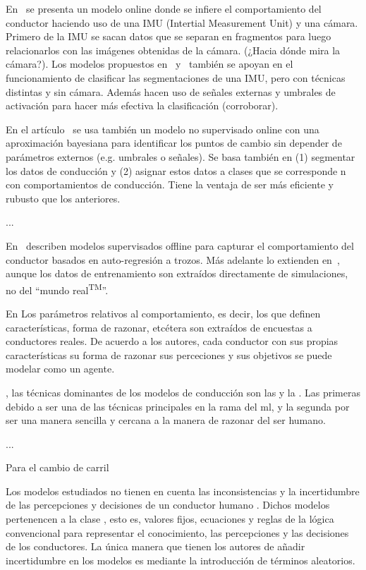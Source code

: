 En~\cite{maye2011bayesian} se presenta un modelo online donde se infiere el comportamiento del conductor haciendo uso de una IMU (Intertial Measurement Unit) y una cámara. Primero de la IMU se sacan datos que se separan en fragmentos para luego relacionarlos con las imágenes obtenidas de la cámara. (\TODO ¿Hacia dónde mira la cámara?). Los modelos propuestos en~\cite{johnson2011driving} y~\cite{van2013driver} también se apoyan en el funcionamiento de clasificar las segmentaciones de una IMU, pero con técnicas distintas y sin cámara. Además hacen uso de señales externas y umbrales de activación para hacer más efectiva la clasificación (\TODO corroborar).

En el artículo~\cite{bender2015unsupervised} se usa también un modelo no supervisado online con una aproximación bayesiana para identificar los puntos de cambio sin depender de parámetros externos (e.g. umbrales o señales). Se basa también en (1) segmentar los datos de conducción y (2) asignar estos datos a clases que se corresponde n con comportamientos de conducción. Tiene la ventaja de ser más eficiente y rubusto que los anteriores.

...

En~\cite{sekizawa2007modeling} describen modelos supervisados offline para capturar el comportamiento del conductor basados en auto-regresión a trozos. Más adelante lo extienden en~\cite{terada2010multi}, aunque los datos de entrenamiento son extraídos directamente de simulaciones, no del \enquote{mundo real\textsuperscript{TM}}.

\newthought{}

En \cite{Dia2002} Los parámetros relativos al comportamiento, es decir, los que definen características, forma de razonar, etcétera son extraídos de encuestas a conductores reales. De acuerdo a los autores, cada conductor con sus propias características su forma de razonar sus perceciones y sus objetivos se puede modelar como un agente.

, las técnicas dominantes de los modelos de conducción son las  y la . Las primeras debido a ser una de las técnicas principales en la rama del \gls{ml}, y la segunda por ser una manera sencilla y cercana a la manera de razonar del ser humano.

...

Para el cambio de carril

Los modelos estudiados no tienen en cuenta las inconsistencias y la incertidumbre de las percepciones y decisiones de un conductor humano \cite{McDonald1997}. Dichos modelos pertenencen a la clase , esto es, valores fijos, ecuaciones y reglas de la lógica convencional para representar el conocimiento, las percepciones y las decisiones de los conductores. La única manera que tienen los autores de añadir incertidumbre en los modelos es mediante la introducción de términos aleatorios.


